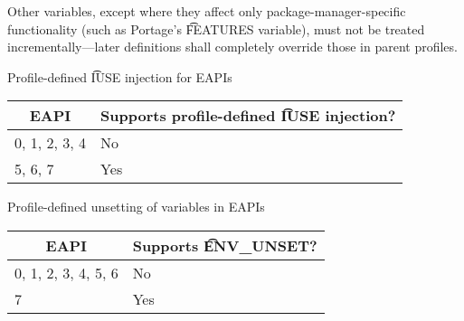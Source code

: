 Other variables, except where they affect only package-manager-specific functionality (such as
Portage's \t{FEATURES} variable), must not be treated incrementally---later definitions shall
completely override those in parent profiles.

\begin{centertable}{Profile-defined \t{IUSE} injection for EAPIs}
    \label{tab:profile-iuse-injection-table}
    \begin{tabular}{ll}
      \toprule
      \multicolumn{1}{c}{\textbf{EAPI}} &
      \multicolumn{1}{c}{\textbf{Supports profile-defined \t{IUSE} injection?}} \\
      \midrule
      0, 1, 2, 3, 4     & No  \\
      5, 6, 7           & Yes \\
      \bottomrule
    \end{tabular}
\end{centertable}

\begin{centertable}{Profile-defined unsetting of variables in EAPIs}
    \label{tab:profile-env-unset}
    \begin{tabular}{ll}
      \toprule
      \multicolumn{1}{c}{\textbf{EAPI}} &
      \multicolumn{1}{c}{\textbf{Supports \t{ENV_UNSET}?}} \\
      \midrule
      0, 1, 2, 3, 4, 5, 6 & No  \\
      7                   & Yes \\
      \bottomrule
    \end{tabular}
\end{centertable}

